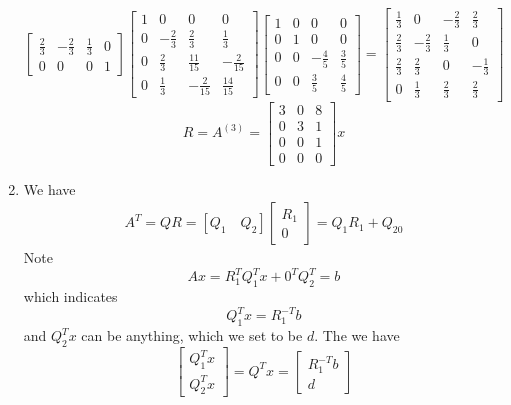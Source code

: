 \documentclass[english,onecolumn]{IEEEtran}
\begin{document}
\begin{enumerate}
$$\begin{bmatrix}
    		\frac{2}{3} & -\frac{2}{3} & \frac{1}{3} & 0\\
    		0 & 0 & 0 & 1
    	\end{bmatrix}\begin{bmatrix}
    		1 & 0 & 0 & 0\\
    		0 & -\frac{2}{3} &\frac{2}{3} & \frac{1}{3}\\
    		0 & \frac{2}{3} & \frac{11}{15} & -\frac{2}{15}\\
    		0 & \frac{1}{3} & -\frac{2}{15} & \frac{14}{15}
    	\end{bmatrix}\begin{bmatrix}
    		1 & 0 & 0 & 0\\
    		0 & 1 &0 & 0\\
    		0 & 0 & -\frac{4}{5} & \frac{3}{5}\\
    		0 & 0 & \frac{3}{5} & \frac{4}{5}
    	\end{bmatrix} = \begin{bmatrix}
    		\frac{1}{3} & 0 & -\frac{2}{3} &\frac{2}{3}\\
    		\frac{2}{3} & -\frac{2}{3} &\frac{1}{3} & 0\\
    		\frac{2}{3} & \frac{2}{3} & 0 & -\frac{1}{3}\\
    		0 & \frac{1}{3} & \frac{2}{3} & \frac{2}{3}
    	\end{bmatrix}$$
    	$$R=A^{(3)} = \begin{bmatrix}
    		3 & 0 & 8 \\
    		0 & 3 & 1\\
    		0 & 0 & 1\\
    		0 & 0 & 0 \end{bmatrix}x$$
    \item We have
   	\begin{align*}
   		A^T =QR=[Q_1\quad Q_2]\begin{bmatrix}
   			R_1\\0
   		\end{bmatrix}= Q_1R_1+Q_20
   	\end{align*}
   	Note 
   	$$Ax = R_1^TQ_1^Tx+0^TQ_2^T=b$$
   	which indicates
   	$$Q_1^Tx=R_1^{-T}b$$
   	and $Q_2^Tx$ can be anything, which we set to be $d$. The we have
   	$$\begin{bmatrix}
   			Q_1^Tx\\ Q_2^Tx
   		\end{bmatrix}=Q^Tx=\begin{bmatrix}
   			R_1^{-T}b\\d
   		\end{bmatrix}$$

\end{enumerate}
\end{document}
